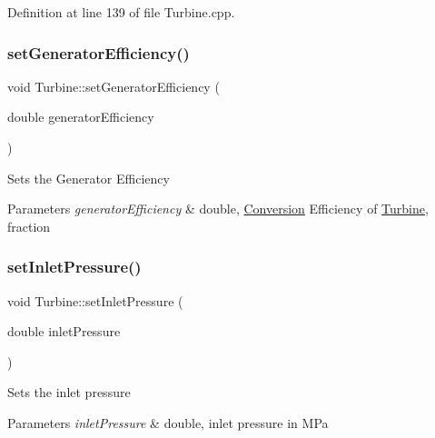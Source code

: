 Definition at line 139 of file Turbine.\+cpp.

\mbox{\label{class_turbine_a51e9c5050a5be51b86dc23e690bd3f40}} 
\subsubsection{\texorpdfstring{set\+Generator\+Efficiency()}{setGeneratorEfficiency()}\hspace{0.1cm}{\footnotesize\ttfamily [3/3]}}
{\footnotesize\ttfamily void Turbine\+::set\+Generator\+Efficiency (\begin{DoxyParamCaption}\item[{double}]{generator\+Efficiency }\end{DoxyParamCaption})}

Sets the Generator Efficiency


\begin{DoxyParams}{Parameters}
{\em generator\+Efficiency} & double, \hyperlink{class_conversion}{Conversion} Efficiency of \hyperlink{class_turbine}{Turbine}, fraction \\
\hline
\end{DoxyParams}
\mbox{\label{class_turbine_a04996baab9a40d449a69c737c00be8e4}} 
\subsubsection{\texorpdfstring{set\+Inlet\+Pressure()}{setInletPressure()}\hspace{0.1cm}{\footnotesize\ttfamily [1/3]}}
{\footnotesize\ttfamily void Turbine\+::set\+Inlet\+Pressure (\begin{DoxyParamCaption}\item[{double}]{inlet\+Pressure }\end{DoxyParamCaption})}

Sets the inlet pressure


\begin{DoxyParams}{Parameters}
{\em inlet\+Pressure} & double, inlet pressure in M\+Pa \\
\hline
\end{DoxyParams}


